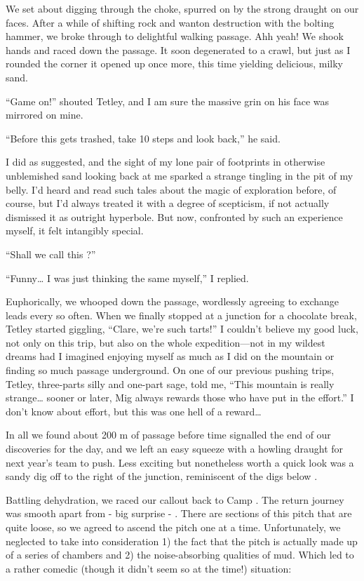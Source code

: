 We set about digging through the choke, spurred on by the strong draught
on our faces. After a while of shifting rock and wanton destruction with
the bolting hammer, we broke through to delightful walking passage. Ahh
yeah! We shook hands and raced down the passage. It soon degenerated to
a crawl, but just as I rounded the corner it opened up once more, this
time yielding delicious, milky sand.

``Game on!'' shouted Tetley, and I am sure the massive grin on his face
was mirrored on mine.

``Before this gets trashed, take 10 steps and look back,'' he said.

I did as suggested, and the sight of my lone pair of footprints in
otherwise unblemished sand looking back at me sparked a strange tingling
in the pit of my belly. I'd heard and read such tales about the magic of
exploration before, of course, but I'd always treated it with a degree
of scepticism, if not actually dismissed it as outright hyperbole. But
now, confronted by such an experience myself, it felt intangibly
special.

``Shall we call this ?''

``Funny\ldots{} I was just thinking the same myself,'' I replied.

Euphorically, we whooped down the passage, wordlessly agreeing to
exchange leads every so often. When we finally stopped at a junction for
a chocolate break, Tetley started giggling, ``Clare, we're such tarts!''
I couldn't believe my good luck, not only on this trip, but also on the
whole expedition---not in my wildest dreams had I imagined enjoying
myself as much as I did on the mountain or finding so much passage
underground. On one of our previous pushing trips, Tetley, three-parts
silly and one-part sage, told me, ``This mountain is really strange\ldots{} 
sooner or later, Mig always rewards those who have put in the effort.''
I don't know about effort, but this was one hell of a reward\ldots{}

In all we found about 200 m of passage before time signalled the end of
our discoveries for the day, and we left an easy squeeze with a howling
draught for next year's team to push. Less exciting but nonetheless
worth a quick look was a sandy dig off to the right of the junction,
reminiscent of the digs below .

Battling dehydration, we raced our callout back to Camp .
The return journey was smooth apart from - big surprise - . There are sections of this pitch that are quite loose, so we
agreed to ascend the pitch one at a time. Unfortunately, we neglected to
take into consideration 1) the fact that the pitch is actually made up
of a series of chambers and 2) the noise-absorbing qualities of mud.
Which led to a rather comedic (though it didn't seem so at the time!)
situation:

